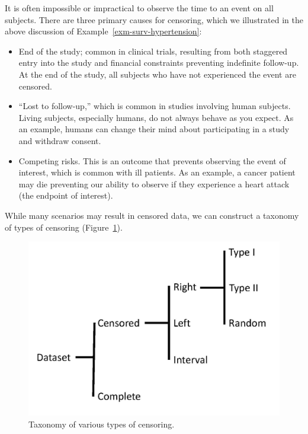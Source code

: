 \documentclass[
  letterpaper,
  DIV=11,
  numbers=noendperiod]{scrreprt}
\providecommand{\tightlist}{%
  \setlength{\itemsep}{0pt}\setlength{\parskip}{0pt}}\usepackage{longtable,booktabs,array}
\theoremstyle{definition}
\theoremstyle{definition}
\theoremstyle{remark}
\begin{document}
It is often impossible or impractical to observe the time to an event on
all subjects. There are three primary causes for censoring, which we
illustrated in the above discussion of
Example~\ref{exm-surv-hypertension}:

\begin{itemize}
\tightlist
\item
  End of the study; common in clinical trials, resulting from both
  staggered entry into the study and financial constraints preventing
  indefinite follow-up. At the end of the study, all subjects who have
  not experienced the event are censored.
\item
  ``Lost to follow-up,'' which is common in studies involving human
  subjects. Living subjects, especially humans, do not always behave as
  you expect. As an example, humans can change their mind about
  participating in a study and withdraw consent.
\item
  Competing risks. This is an outcome that prevents observing the event
  of interest, which is common with ill patients. As an example, a
  cancer patient may die preventing our ability to observe if they
  experience a heart attack (the endpoint of interest).
\end{itemize}

While many scenarios may result in censored data, we can construct a
taxonomy of types of censoring (Figure~\ref{fig-surv-taxonomy}).

\begin{figure}

{\centering \includegraphics{./images/censoring-taxonomy.jpg}

}

\caption{\label{fig-surv-taxonomy}Taxonomy of various types of
censoring.}

\end{figure}
\end{document}
